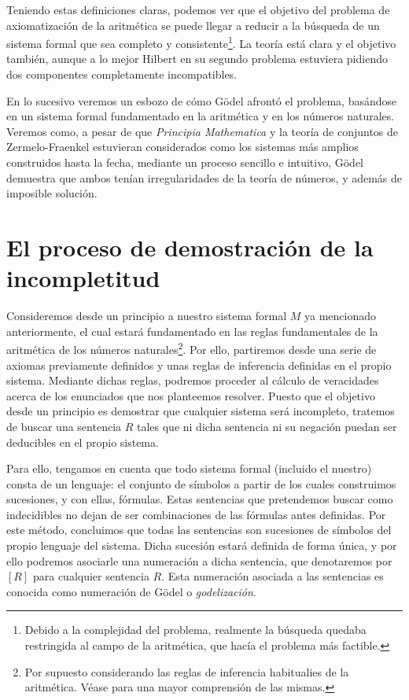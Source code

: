 Teniendo estas definiciones claras, podemos ver que el objetivo del problema de axiomatización de la aritmética se puede llegar a reducir a la búsqueda de un sistema formal que sea completo y consistente\footnote{Debido a la complejidad 
del problema, realmente la búsqueda quedaba restringida al campo de la aritmética, que hacía el problema más factible.}. La teoría está clara y el objetivo también, aunque a lo mejor Hilbert en su segundo problema estuviera pidiendo dos componentes completamente incompatibles.

En lo sucesivo veremos un esbozo de cómo Gödel afrontó el problema, basándose en un sistema formal fundamentado en la aritmética y en los números naturales. Veremos como, a pesar de que \textit{Principia Mathematica} y la teoría de conjuntos 
de Zermelo-Fraenkel estuvieran considerados como los sistemas más amplios construidos hasta la fecha, mediante un proceso sencillo e intuitivo, Gödel demuestra que ambos tenían irregularidades de la teoría de números, y además de imposible solución.

\section{El proceso de demostración de la incompletitud}

Consideremos desde un principio a nuestro sistema formal $M$ ya mencionado anteriormente, el cual estará fundamentado en las reglas fundamentales de la aritmética de los números naturales\footnote{Por supuesto considerando las reglas de inferencia
habitualies de la aritmética. Véase \cite{godel1986collected} para una mayor comprensión de las mismas.}. Por ello, partiremos desde una serie de axiomas previamente definidos y unas reglas de inferencia definidas en el propio sistema. Mediante dichas 
reglas, podremos proceder al cálculo de veracidades acerca de los enunciados que nos planteemos resolver. Puesto que el objetivo desde un principio es demostrar que cualquier sistema será incompleto, tratemos de buscar una sentencia $R$ tales que ni dicha 
sentencia ni su negación puedan ser deducibles en el propio sistema.

Para ello, tengamos en cuenta que todo sistema formal (incluido el nuestro) consta de un lenguaje: el conjunto de símbolos a partir de los cuales construimos sucesiones, y con ellas, fórmulas. Estas sentencias que pretendemos buscar como indecidibles 
no dejan de ser combinaciones de las fórmulas antes definidas. Por este método, concluimos que todas las sentencias son sucesiones de símbolos del propio lenguaje del sistema. Dicha sucesión estará definida de forma única, y por ello podremos asociarle 
una numeración a dicha sentencia, que denotaremos por $[R]$ para cualquier sentencia $R$. Esta numeración asociada a las sentencias es conocida como numeración de Gödel o \textit{godelización}.

